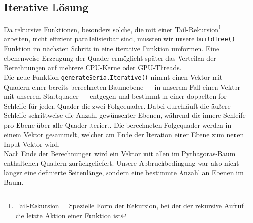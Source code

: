 \vspace{-0.5cm}
\subsection{Iterative Lösung}\label{iterativ}
\vspace{-0.25cm}
Da rekursive Funktionen, besonders solche, die mit einer Tail-Rekursion\footnote{Tail-Rekursion = Spezielle Form der Rekursion, 
bei der der rekursive Aufruf die letzte Aktion einer Funktion ist}
arbeiten, nicht effizient parallelisierbar sind, mussten wir unsere \texttt{buildTree()} Funktion im nächsten Schritt in eine iterative
Funktion umformen. Eine ebenenweise Erzeugung der Quader ermöglicht später das Verteilen der Berechnungen auf mehrere CPU-Kerne 
oder GPU-Threads.\\
Die neue Funktion \texttt{generateSerialIterative()} nimmt einen Vektor mit Quadern einer bereits berechneten Baumebene --- in unserem
Fall einen Vektor mit unserem Startquader --- entgegen und bestimmt in einer doppelten for-Schleife für jeden Quader die zwei Folgequader.
Dabei durchläuft die äußere Schleife schrittweise die Anzahl gewünschter Ebenen, während die innere Schleife pro Ebene über alle Quader 
iteriert. Die berechneten Folgequader werden in einem Vektor gesammelt, welcher am Ende der Iteration einer Ebene zum neuen \glqq Input\grqq -Vektor 
wird.\\
Nach Ende der Berechnungen wird ein Vektor mit allen im Pythagoras-Baum enthaltenen Quadern zurückgeliefert. 
Unsere Abbruchbedingung war also nicht länger eine definierte Seitenlänge, sondern eine bestimmte Anzahl an Ebenen im Baum.
\vspace{0.25cm}
